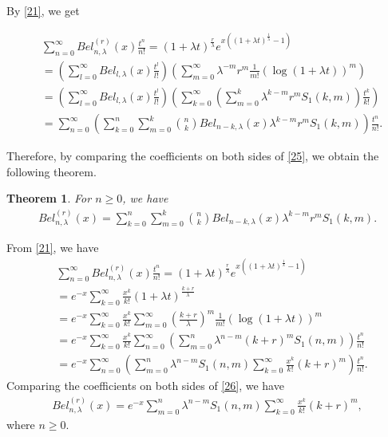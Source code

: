 \documentclass[10pt,twoside,reqno]{amsart}
\numberwithin{equation}{section}
\newtheorem{thm}{\bf Theorem}[section]
\begin{document}
By \eqref{21}, we get

\begin{equation}\begin{split}\label{25}
&\sum_{n=0}^\infty Bel_{n,\lambda }^{(r)}(x) \frac{t^n}{n!} = (1+\lambda t)^{\frac{r}{\lambda }} e^{x ((1+\lambda t)^{\frac{1}{\lambda }}-1)}\\
&= \left( \sum_{l=0}^\infty Bel_{l,\lambda }(x) \frac{t^l}{l!} \right) \left( \sum_{m=0}^\infty \lambda ^{-m} r^m \frac{1}{m!} (\log(1+\lambda t))^m \right)\\
&= \left( \sum_{l=0}^\infty Bel_{l,\lambda }(x) \frac{t^l}{l!} \right) \left( \sum_{k=0}^\infty \left( \sum_{m=0}^k \lambda ^{k-m} r^m S_1(k,m) \right) \frac{t^k}{k!} \right)\\
&= \sum_{n=0}^\infty \left( \sum_{k=0}^n \sum_{m=0}^k {n \choose k} Bel_{n-k,\lambda } (x) \lambda ^{k-m} r^m S_1(k,m) \right) \frac{t^n}{n!}.
\end{split}\end{equation}

Therefore, by comparing the coefficients on both sides of \eqref{25}, we obtain the following theorem.

\begin{thm}
For $n \geq 0$, we have
\begin{equation*}\begin{split}
Bel_{n,\lambda }^{(r)}(x) = \sum_{k=0}^n \sum_{m=0}^k {n \choose k} Bel_{n-k,\lambda } (x) \lambda ^{k-m} r^m S_1(k,m).
\end{split}\end{equation*}
\end{thm}

From \eqref{21}, we have
\begin{equation}\begin{split}\label{26}
&\sum_{n=0}^\infty Bel_{n,\lambda }^{(r)}(x) \frac{t^n}{n!} = (1+\lambda t)^{\frac{r}{\lambda }}e^{x((1+\lambda t)^{\frac{1}{\lambda }}-1)} \\
&= e^{-x}\sum_{k=0}^\infty \frac{x^k}{k!} (1+\lambda t)^{\frac{k+r}{\lambda }} \\
&= e^{-x} \sum_{k=0}^\infty \frac{x^k}{k!} \sum_{m=0}^\infty \left( \frac{k+r}{\lambda }\right)^m \frac{1}{m!} (\log(1+\lambda t))^m \\
&= e^{-x} \sum_{k=0}^\infty \frac{x^k}{k!} \sum_{n=0}^\infty \left( \sum_{m=0}^n \lambda ^{n-m} (k+r)^m S_1(n,m) \right) \frac{t^n}{n!} \\
&= e^{-x}\sum_{n=0}^\infty \left( \sum_{m=0}^n \lambda ^{n-m} S_1(n,m) \sum_{k=0}^\infty \frac{x^k}{k!} (k+r)^m \right) \frac{t^n}{n!}.
\end{split}\end{equation}
Comparing the coefficients on both sides of \eqref{26}, we have
\begin{equation}\begin{split}\label{27}
Bel_{n,\lambda }^{(r)}(x) =  e^{-x}\sum_{m=0}^n \lambda ^{n-m} S_1(n,m) \sum_{k=0}^\infty \frac{x^k}{k!} (k+r)^m,
\end{split}\end{equation}
where $n \geq 0$.
\end{document}

